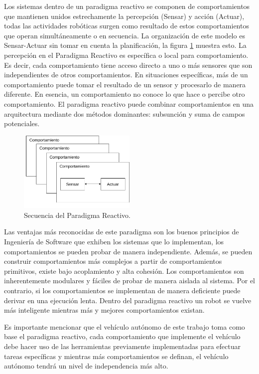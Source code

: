 Los sistemas dentro de un paradigma reactivo se componen de comportamientos que mantienen unidos estrechamente la percepción (Sensar) y acción (Actuar), todas las actividades robóticas surgen como resultado de estos comportamientos que operan simultáneamente o en secuencia. La organización de este modelo es Sensar-Actuar sin tomar en cuenta la planificación, la figura  \ref{fig:reactive_paradigm} muestra esto. La percepción en el Paradigma Reactivo es específica o local para comportamiento. Es decir, cada comportamiento tiene acceso directo a uno o más sensores que son independientes de otros comportamientos. En situaciones específicas, más de un comportamiento puede tomar el resultado de un sensor y procesarlo de manera diferente. En esencia, un comportamiento no conoce lo que hace o percibe otro comportamiento. El paradigma reactivo puede combinar comportamientos en una arquitectura mediante dos métodos dominantes: subsunción y suma de campos potenciales.
\begin{figure}
    \centering
    \includegraphics[width=0.5\textwidth]{Figures/Figures_Cap06/reactive_paradigm.pdf}
    \caption{Secuencia del Paradigma Reactivo.}
    \label{fig:reactive_paradigm}
\end{figure}

Las ventajas más reconocidas de este paradigma son los buenos principios de Ingeniería de Software que exhiben los sistemas que lo implementan, los comportamientos se pueden probar de manera independiente. Además, se pueden construir comportamientos más complejos a partir de comportamientos primitivos, existe bajo acoplamiento y alta cohesión. Los comportamientos son inherentemente modulares y fáciles de probar de manera aislada al sistema. Por el contrario, si los comportamientos se implementan de manera deficiente puede derivar en una ejecución lenta. Dentro del paradigma reactivo un robot se vuelve más inteligente mientras más y mejores comportamientos existan. 

Es importante mencionar que el vehículo autónomo de este trabajo toma como base el paradigma reactivo, cada comportamiento que implemente el vehículo debe hacer uso de las herramientas previamente implementadas para efectuar tareas específicas y mientras más comportamientos se definan, el vehículo autónomo tendrá un nivel de independencia más alto.

